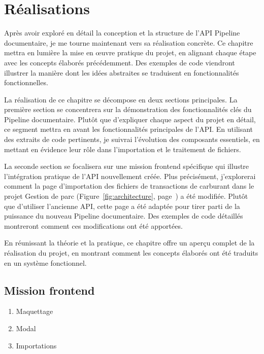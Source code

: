 \chapter{Réalisations}\label{ch:realisations}

Après avoir exploré en détail la conception et la structure de l'API Pipeline documentaire, je me tourne maintenant vers sa réalisation concrète. Ce chapitre mettra en lumière la mise en œuvre pratique du projet, en alignant chaque étape avec les concepts élaborés précédemment. Des exemples de code viendront illustrer la manière dont les idées abstraites se traduisent en fonctionnalités fonctionnelles.

La réalisation de ce chapitre se décompose en deux sections principales. La première section se concentrera sur la démonstration des fonctionnalités clés du Pipeline documentaire. Plutôt que d'expliquer chaque aspect du projet en détail, ce segment mettra en avant les fonctionnalités principales de l'API. En utilisant des extraits de code pertinents, je suivrai l'évolution des composants essentiels, en mettant en évidence leur rôle dans l'importation et le traitement de fichiers.

La seconde section se focalisera sur une mission frontend spécifique qui illustre l'intégration pratique de l'API nouvellement créée. Plus précisément, j'explorerai comment la page d'importation des fichiers de transactions de carburant dans le projet Gestion de parc (Figure~\ref{fig:architecture}, page~\pageref{fig:architecture}) a été modifiée. Plutôt que d'utiliser l'ancienne API, cette page a été adaptée pour tirer parti de la puissance du nouveau Pipeline documentaire. Des exemples de code détaillés montreront comment ces modifications ont été apportées.

En réunissant la théorie et la pratique, ce chapitre offre un aperçu complet de la réalisation du projet, en montrant comment les concepts élaborés ont été traduits en un système fonctionnel.



\section{Mission frontend}

\begin{enumerate}
    \item Maquettage
    \item Modal
    \item Importations
\end{enumerate}